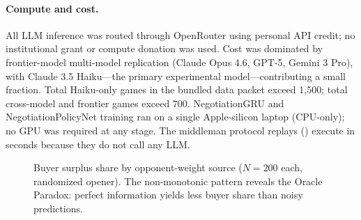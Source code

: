 \documentclass[11pt,a4paper]{article}
\begin{document}
\paragraph{Compute and cost.} All LLM inference was routed through OpenRouter using personal API credit; no institutional grant or compute donation was used. Cost was dominated by frontier-model multi-model replication (Claude Opus 4.6, GPT-5, Gemini 3 Pro), with Claude 3.5 Haiku---the primary experimental model---contributing a small fraction. Total Haiku-only games in the bundled data packet exceed 1{,}500; total cross-model and frontier games exceed 700. NegotiationGRU and NegotiationPolicyNet training ran on a single Apple-silicon laptop (CPU-only); no GPU was required at any stage. The middleman protocol replays () execute in seconds because they do not call any LLM.


\begin{figure}[t]
\centering
{}
\caption{Buyer surplus share by opponent-weight source ($N = 200$ each, randomized opener). The non-monotonic pattern reveals the Oracle Paradox: perfect information yields less buyer share than noisy predictions.}
\label{fig:ablation_bars}
\end{figure}
\end{document}
